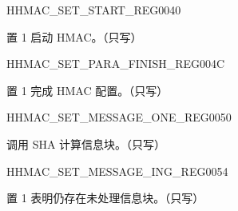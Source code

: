 \begin{register}{H}{HMAC\_SET\_START\_REG}{\hexprefix{}0040}\label{regdesc:HMACSETSTARTREG}
%
%
\regnewline%
\begin{regdesc}\begin{reglist}
\label{fielddesc:HMACSETSTART}\item [HMAC\_SET\_START] 置 1 启动 HMAC。（只写）
\end{reglist}\end{regdesc}
\end{register}


\begin{register}{H}{HMAC\_SET\_PARA\_FINISH\_REG}{\hexprefix{}004C}\label{regdesc:HMACSETPARAFINISHREG}
%
%
\regnewline%
\begin{regdesc}\begin{reglist}
\label{fielddesc:HMACSETPARAEND}\item [HMAC\_SET\_PARA\_END] 置 1 完成 HMAC 配置。（只写）
\end{reglist}\end{regdesc}
\end{register}


\begin{register}{H}{HMAC\_SET\_MESSAGE\_ONE\_REG}{\hexprefix{}0050}\label{regdesc:HMACSETMESSAGEONEREG}
%
%
\regnewline%
\begin{regdesc}\begin{reglist}
\label{fielddesc:HMACSETTEXTONE}\item [HMAC\_SET\_TEXT\_ONE] 调用 SHA 计算信息块。（只写）
\end{reglist}\end{regdesc}
\end{register}


\begin{register}{H}{HMAC\_SET\_MESSAGE\_ING\_REG}{\hexprefix{}0054}\label{regdesc:HMACSETMESSAGEINGREG}
%
%
\regnewline%
\begin{regdesc}\begin{reglist}
\label{fielddesc:HMACSETTEXTING}\item [HMAC\_SET\_TEXT\_ING] 置 1 表明仍存在未处理信息块。（只写）
\end{reglist}\end{regdesc}
\end{register}


